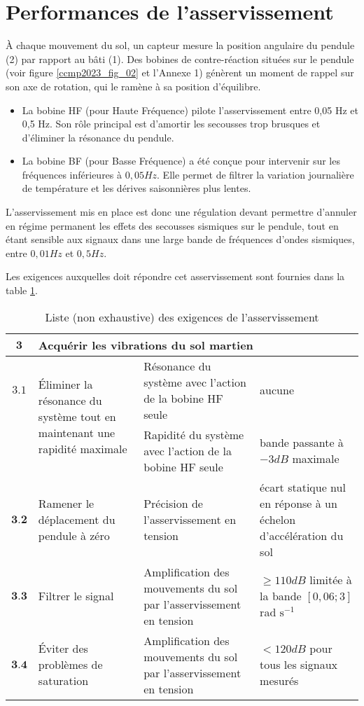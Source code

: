 \section{Performances de l'asservissement}
\ifprof
\else
À chaque mouvement du sol, un capteur mesure la position angulaire du pendule (2) par rapport au bâti (1). Des bobines de contre-réaction situées sur le pendule (voir figure \ref{ccmp2023_fig_02} et l'Annexe 1) génèrent un moment de rappel sur son axe de rotation, qui le ramène à sa position d'équilibre.

\begin{itemize}
  \item La bobine HF (pour Haute Fréquence) pilote l'asservissement entre 0,05 Hz et 0,5 Hz. Son rôle principal est d'amortir les secousses trop brusques et d'éliminer la résonance du pendule.
  \item La bobine BF (pour Basse Fréquence) a été conçue pour intervenir sur les fréquences inférieures à $0,05 \si{Hz}$. Elle permet de filtrer la variation journalière de température et les dérives saisonnières plus lentes.
\end{itemize}

L'asservissement mis en place est donc une régulation devant permettre d'annuler en régime permanent les effets des secousses sismiques sur le pendule, tout en étant sensible aux signaux dans une large bande de fréquences d'ondes sismiques, entre $0,01 \si{Hz}$ et $0,5 \si{Hz}$.

Les exigences auxquelles doit répondre cet asservissement sont fournies dans la table \ref{ccmp2023_tab_03}.

\begin{table}[!h]
\centering
\begin{tabular}{cp{5cm}p{5cm}p{5cm}}
\hline
$\mathbf{3}$ & \multicolumn{3}{l}{Acquérir les vibrations du sol martien}  \\
\hline
$\mathbf{3.1}$ &\multirow{2}{4cm}{Éliminer la résonance du système tout en maintenant une rapidité maximale}&
Résonance du système avec l'action de la bobine HF seule &  aucune \\
\cline { 3 - 4 }
& & Rapidité du système avec l'action de la bobine HF seule & bande passante à $-3 \si{dB}$ maximale \\
\hline
$\mathbf{3 . 2}$ & 
Ramener le déplacement du pendule à zéro 
& Précision de l'asservissement en tension & écart statique nul en réponse à un échelon d'accélération du sol \\
\hline
$\mathbf{3 . 3}$ & Filtrer le signal & Amplification des mouvements du sol par l'asservissement en tension & 
$\geq 110 \si{dB}$ limitée à la bande $[0,06 ; 3]$ \si{rad} $\mathrm{s}^{-1}$ \\
\hline
$\mathbf{3 . 4}$ & Éviter des problèmes de saturation & Amplification des mouvements du sol par l'asservissement en tension 
&$<120 \si{dB}$ pour tous les signaux mesurés \\
\hline
\end{tabular}
\caption{\label{ccmp2023_tab_03}  Liste (non exhaustive) des exigences de l'asservissement}
\end{table}



